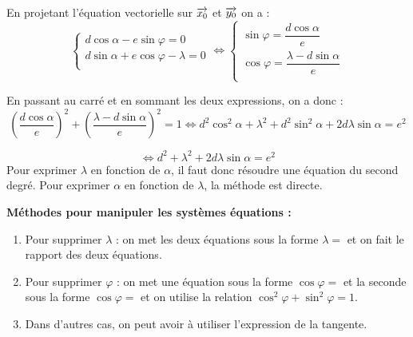 \documentclass[11pt,oneside]{article}
\begin{document}
\begin{exemple}
En projetant l'équation vectorielle sur $\overrightarrow{x_0}$ et $\overrightarrow{y_0}$ on a : 
$$
\left\{
\begin{array}{l}
d\cos\alpha - e \sin \varphi = 0 \\
d\sin\alpha + e \cos \varphi - \lambda= 0 \\
\end{array}
\right.
\Longleftrightarrow 
\left\{
\begin{array}{l}
\sin \varphi = \dfrac{d\cos\alpha}{e}  \\
\cos \varphi = \dfrac{\lambda - d\sin\alpha}{e} \\
\end{array}
\right.
$$

En passant au carré et en sommant les deux expressions, on a donc : 
$$
\left(\dfrac{d\cos\alpha}{e}\right)^2 + \left(\dfrac{\lambda - d\sin\alpha}{e}\right)^2 = 1 
\Longleftrightarrow
d^2\cos^2\alpha + \lambda^2 + d^2\sin^2\alpha +2d\lambda\sin\alpha = e^2
$$

$$
\Longleftrightarrow
d^2+ \lambda^2 +2d\lambda\sin\alpha = e^2
$$
Pour exprimer $\lambda$ en fonction de $\alpha$, il faut donc résoudre une équation du second degré. Pour exprimer $\alpha$ en fonction de $\lambda$, la méthode est directe. 


\end{exemple}

\begin{methode}
\textbf{Méthodes pour manipuler les systèmes équations :} 
\begin{enumerate}
\item Pour supprimer $\lambda$ : on met les deux équations sous la forme $\lambda =$ et on fait le rapport des deux équations.
\item Pour supprimer $\varphi$ : on met une équation sous la forme $\cos\varphi = $ et la seconde sous la forme $\cos\varphi = $ et on utilise la relation $\cos^2\varphi +\sin^2\varphi =1 $.
\item Dans d'autres cas, on peut avoir à utiliser l'expression de la tangente.
\end{enumerate}
\end{methode}
\end{document}
